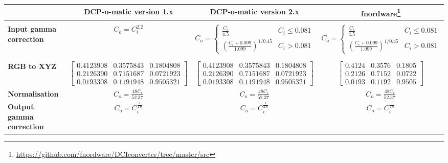 \documentclass{article}
\begin{document}
\begin{minipage}{\textwidth}
\begin{tabular}{|l|c|c|c|}
\hline
& \textbf{DCP-o-matic version 1.x}
& \textbf{DCP-o-matic version 2.x}
& \textbf{fnordware}\footnote{\url{https://github.com/fnordware/DCIconverter/tree/master/src}} \\

\hline
& & & \\
\parbox[c][2em][c]{2cm}{\textbf{Input gamma correction}} &
\parbox[c][2em][c]{2cm}{$C_o = C_i^{2.2}$} &
$C_o = \left\{ \begin{array}{ll} \frac{C_i}{4.5} & C_i \leq 0.081 \\ \left(\frac{C_i + 0.099}{1.099}\right)^{1/0.45} & C_i > 0.081 \end{array} \right.$ &
$C_o = \left\{ \begin{array}{ll} \frac{C_i}{4.5} & C_i \leq 0.081 \\ \left(\frac{C_i + 0.099}{1.099}\right)^{1/0.45} & C_i > 0.081 \end{array} \right.$ \\

& & & \\
\hline
& & & \\
\textbf{RGB to XYZ} &
$\left[\begin{array}{lll} 0.4123908 & 0.3575843 & 0.1804808 \\
                          0.2126390 & 0.7151687 & 0.0721923 \\
                          0.0193308 & 0.1191948 & 0.9505321 \end{array}\right]$ &
$\left[\begin{array}{lll} 0.4123908 & 0.3575843 & 0.1804808 \\
                          0.2126390 & 0.7151687 & 0.0721923 \\
                          0.0193308 & 0.1191948 & 0.9505321 \end{array}\right]$ &
$\left[\begin{array}{lll} 0.4124 & 0.3576 & 0.1805 \\
                          0.2126 & 0.7152 & 0.0722 \\
                          0.0193 & 0.1192 & 0.9505 \end{array}\right]$ \\[2em]

\hline
\textbf{Normalisation} &
\parbox[c][4em][c]{3cm}{ \(\displaystyle C_o = \frac{48 C_i}{52.37}\)} &
\parbox[c][4em][c]{3cm}{ \(\displaystyle C_o = \frac{48 C_i}{52.37}\)} &
\parbox[c][4em][c]{3cm}{ \(\displaystyle C_o = \frac{48 C_i}{52.37}\)} \\

\hline
\parbox[c][2em][c]{2cm}{\textbf{Output gamma correction}} &
\parbox[c][4em][c]{3cm}{\(\displaystyle C_o = C_i^{\frac{1}{2.6}} \)} &
\parbox[c][4em][c]{3cm}{\(\displaystyle C_o = C_i^{\frac{1}{2.6}} \)} &
\parbox[c][4em][c]{3cm}{\(\displaystyle C_o = C_i^{\frac{1}{2.6}} \)} \\
\hline

\end{tabular}
\end{minipage}
\end{document}
